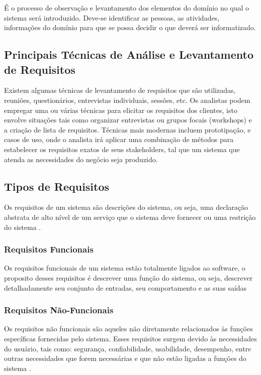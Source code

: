 É o processo de observação e levantamento dos elementos do domínio no
qual o sistema será introduzido. Deve-se identificar as pessoas, as atividades,
informações do domínio para que se possa decidir o que deverá ser informatizado.

\subsection{Principais Técnicas de Análise e Levantamento de Requisitos}
\label{subsec:principaisTecnicasAnalise}

Existem algumas técnicas de levantamento de requisitos que são utilizadas,
reuniões, questionários, entrevistas individuais, sessões, etc. Os analistas podem
empregar uma ou várias técnicas para elicitar os requisitos dos clientes, isto envolve
situações tais como organizar entrevistas ou grupos focais (workshops) e a criação
de lista de requisitos. Técnicas mais modernas incluem prototipação, e casos de
uso, onde o analista irá aplicar uma combinação de métodos para estabelecer os
requisitos exatos de seus stakeholders, tal que um sistema que atenda as
necessidades do negócio seja produzido.

\subsection{Tipos de Requisitos}
\label{subsec:tiposRequisitos}

Os requisitos de um sistema são descrições do sistema, ou seja, uma declaração
abstrata de alto nível de um serviço que o sistema deve fornecer ou uma restrição 
do sistema \cite{Sommerville:2008}.

\subsubsection{Requisitos Funcionais}
\label{subsec:RequisitosFuncionais}

Os requisitos funcionais de um sistema estão totalmente ligados ao software, o
proposito desses requisitos é descrever uma função do sistema, ou seja, 
descrever detalhadamente seu conjunto de entradas, seu comportamento e as  suas
saídas \cite{Sommerville:2008}

\subsubsection{Requisitos Não-Funcionais}
\label{subsec:RequisitosNaoFuncionais}

Os requisitos não funcionais são aqueles não diretamente relacionados às funções
específicas fornecidas pelo sistema. Esses requisitos surgem devido às 
necessidades do usuário, tais como: segurança, confiabilidade, usabilidade, 
desempenho, entre outras necessidades que forem necessárias e que não estão 
ligadas a funções do sistema \cite{Sommerville:2008}.


